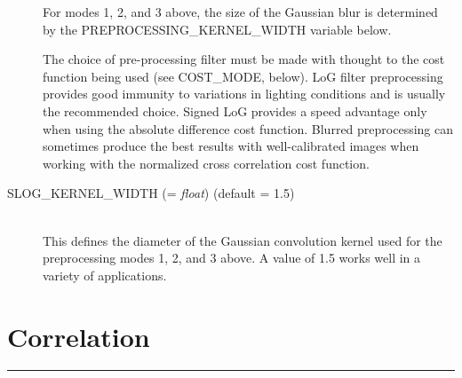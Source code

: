 \begin{description}
  For modes 1, 2, and 3 above, the size of the Gaussian blur is
  determined by the PREPROCESSING\_KERNEL\_WIDTH variable below.

  The choice of pre-processing filter must be made with thought to the
  cost function being used (see COST\_MODE, below).  LoG filter preprocessing
  provides good immunity to variations in lighting conditions
  and is usually the recommended choice.  Signed LoG provides a speed
  advantage only when using the absolute difference cost function.
  Blurred preprocessing can sometimes produce the best results with
  well-calibrated images when working with the normalized cross
  correlation cost function.

\item[SLOG\_KERNEL\_WIDTH \textnormal{\small{(= \emph{float})}} (default = 1.5)] \hfill \\
  This defines the diameter of the Gaussian convolution kernel used
  for the preprocessing modes 1, 2, and 3 above. A value of 1.5 works
  well in a variety of applications.

\end{description}


\section{Correlation}
\hrule
\bigskip

